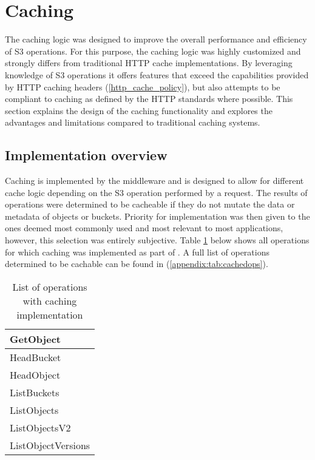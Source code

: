 \section{Caching}

The caching logic was designed to improve the overall performance and efficiency of S3 operations. For this purpose, the caching logic was highly customized and strongly differs from traditional HTTP cache implementations. By leveraging knowledge of S3 operations it offers features that exceed the capabilities provided by HTTP caching headers (\ref{http_cache_policy}), but also attempts to be compliant to caching as defined by the HTTP standards where possible. This section explains the design of the caching functionality and explores the advantages and limitations compared to traditional caching systems.

\subsection{Implementation overview}

Caching is implemented by the  middleware and is designed to allow for different cache logic depending on the S3 operation performed by a request. The results of operations were determined to be cacheable if they do not mutate the data or metadata of objects or buckets. Priority for implementation was then given to the ones deemed most commonly used and most relevant to most applications, however, this selection was entirely subjective. Table \ref{tab:cachedops} below shows all operations for which caching was implemented as part of . A full list of operations determined to be cachable can be found in (\ref{appendix:tab:cachedops}).
\begin{table}[h]
	\begin{center}
		\begin{tabular}{| l |}
			\hline
			GetObject \\ \hline
			HeadBucket \\ \hline
			HeadObject \\ \hline
			ListBuckets \\ \hline
			ListObjects \\ \hline
			ListObjectsV2 \\ \hline
			ListObjectVersions \\ \hline
		\end{tabular}
	\end{center}
	\caption{List of operations with caching implementation}
	\label{tab:cachedops}
\end{table}


